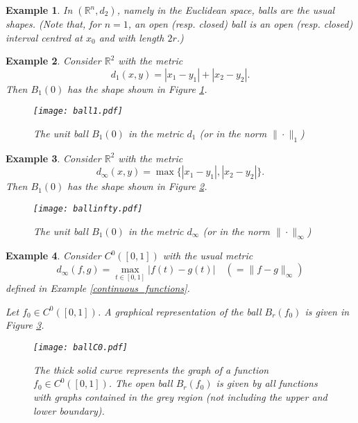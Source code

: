 \documentclass[a4paper,reqno]{amsart}
\numberwithin{equation}{section}
\newtheorem{example}{Example}
\def\R{\mathbb{R}}
\begin{document}
\begin{example}
In $(\R^n, d_2)$, namely in the Euclidean space, balls are the usual shapes. (Note that, for $n=1$, an open (resp. closed) ball is an open (resp. closed) interval centred at $x_0$ and with length $2r$.)
\end{example}

\begin{example}
Consider $\R^2$ with the metric
\[
d_1(x,y) = |x_1 - y_1| + |x_2 - y_2|.
\]
Then $B_1(0)$ has the shape shown in Figure \ref{fig:ball1}.
\begin{figure}[ht]
\begin{center}
\texttt{[image: ball1.pdf]}
\caption{The unit ball $B_1(0)$ in the metric $d_1$ (or in the norm $\|\cdot\|_{1}$)}
\label{fig:ball1}
\end{center}
\end{figure}
\end{example}

\begin{example}
Consider $\R^2$ with the metric
\[
d_\infty(x,y) = \max\{|x_1 - y_1|,|x_2 - y_2|\}.
\]
Then $B_1(0)$ has the shape shown in Figure \ref{fig:ballinfty}.
\begin{figure}[ht]
\begin{center}
\texttt{[image: ballinfty.pdf]}
\caption{The unit ball $B_1(0)$ in the metric $d_\infty$ (or in the norm $\|\cdot\|_{\infty}$)}
\label{fig:ballinfty}
\end{center}
\end{figure}
\end{example}

\begin{example}
Consider $C^0([0,1])$ with the usual metric
\[
d_\infty(f,g) = \max_{t \in [0,1]} |f(t) - g(t)| \quad (=\|f-g\|_\infty)
\]
defined in Example \ref{continuous_functions}.

Let $f_0 \in C^0([0,1])$. A graphical representation of the ball $B_r(f_0)$ is given in Figure \ref{fig:ballC0}.
\begin{figure}[ht]
\begin{center}
\texttt{[image: ballC0.pdf]}
\caption{The thick solid curve represents the graph of a function $f_0 \in C^0([0,1])$. The open ball $B_r(f_0)$ is given by all functions with graphs contained in the grey region (not including the upper and lower boundary).}
\label{fig:ballC0}
\end{center}
\end{figure}
\end{example}
\end{document}

